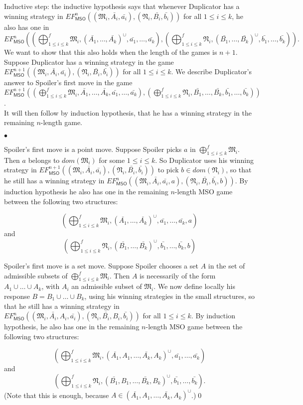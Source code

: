 \documentclass{LMCS}
\newcommand{\frM}{\mathfrak{M}}
\newcommand{\frN}{\mathfrak{N}}
\newcommand{\mso}{\textsf{MSO}\xspace}
\begin{document}
Inductive step: the inductive hypothesis says that whenever Duplicator has a
winning strategy in
$EF_\mso^n((\frM_i,\bar{A_i},\bar{a_i}),(\frN_i,\bar{B_i},\bar{b_i}))$
for all $1 \leq i \leq k$, he also has one in
$$EF_\mso^n((\bigoplus_{1\leq i\leq k}^f
\frM_i,(\bar{A_1}, \ldots,
\bar{A_k})^\cup,\bar{a_1},\ldots,\bar{a_k}), (\bigoplus_{ 1 \leq
i \leq k}^f \frN_i,(\bar{B_1},\ldots,\bar{B_k})^\cup,
\bar{b_1},\ldots,\bar{b_k})).$$ We want to show that this also
holds when the length of the games is $n+1$. Suppose Duplicator
has a winning strategy in the game
$EF_\mso^{n+1}((\frM_i,\bar{A_i},\bar{a_i}),(\frN_i,\bar{B_i},\bar{b_i}))$
for all $1 \leq i\leq k$. We describe Duplicator's answer to
Spoiler's first move in the game $EF_\mso^{n+1}((\bigoplus_{1\leq i\leq
k}^f \frM_i, \bar{A_1}, \ldots,
\bar{A_k},\bar{a_1},\ldots,\bar{a_k}), (\bigoplus_{ 1 \leq
i \leq k}^f \frN_i,\bar{B_1}, \ldots, \bar{B_k},
\bar{b_1},\ldots,\bar{b_k}))$.\\ It will then follow by induction
hypothesis, that he has a winning strategy in the remaining
$n$-length game.
\begin{iteMize}{$\bullet$}
\item   Spoiler's first move is a point move. Suppose Spoiler
picks $a$ in $\bigoplus_{1\leq i\leq k}^f \frM_i$. Then $a$ belongs to
$dom(\frM_i)$ for some $1\leq i\leq k$. So Duplicator uses his
winning strategy in
$EF_\mso^{n+1}((\frM_i,\bar{A_i},\bar{a_i}),(\frN_i,\bar{B_i},\bar{b_i}))$
to pick $b\in dom(\frN_i)$,
 so that he still has a winning strategy in $EF_\mso^n((\frM_i,\bar{A_i},\bar{a_i},a),(\frN_i,\bar{B_i},\bar{b_i},b))$.
 By induction hypothesis he also has one
 in the remaining $n$-length \mso game between the following two structures:
 
 $$(\bigoplus_{1\leq i\leq k}^f
\frM_i,(\bar{A_1},\ldots,\bar{A_k})^\cup,
\bar{a_1},\ldots,\bar{a_k},a)$$
and
$$(\bigoplus_{ 1 \leq i \leq k}^f \frN_i,
(\bar{B_1},\ldots,\bar{B_k})^\cup,
\bar{b_1},\ldots,\bar{b_k},b)$$
\item   Spoiler's first move is a set move. Suppose Spoiler chooses a set
$A$ in the set of admissible subsets of $\bigoplus_{1\leq
i\leq k}^f \frM_i$. Then $A$ is necessarily of the form $A_1 \cup
\ldots \cup A_k$, with $A_i$ an admissible subset of $\frM_i$. We
now define locally his response $B=B_1 \cup \ldots \cup B_k$,
using his winning strategies in the small structures, so that he still
has a winning strategy in
$EF_\mso^n((\frM_i,\bar{A_i},A_i,\bar{a_i}),(\frN_i,\bar{B_i},B_i,\bar{b_i}))$
for all $1 \leq i\leq k$. By induction hypothesis, he also has one
in the remaining $n$-length \mso game between the following two structures:


$$(\bigoplus_{1\leq i\leq k}^f
\frM_i,(\bar{A_1},A_1,\ldots,\bar{A_k},A_k)^\cup,
\bar{a_1},\ldots,\bar{a_k})$$
and
$$(\bigoplus_{ 1 \leq i \leq k}^f \frN_i,
(\bar{B_1},B_1,\ldots,\bar{B_k}, B_k)^\cup,
\bar{b_1},\ldots,\bar{b_k}).$$ 
(Note that this is enough,
because $A \in (\bar{A_1},A_1,\ldots,\bar{A_k},A_k)^\cup$.)\qed
\end{iteMize}\smallskip
\end{document}
